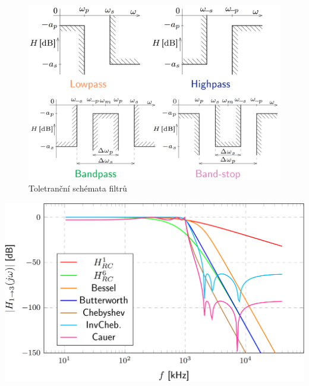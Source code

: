 \documentclass[a4paper,12pt]{article}   %
\begin{document}
\begin{figure}[H]
    \centering
    \includegraphics[width=.6\textwidth]{tolerancni_schema.PNG}
    \caption{Toletranční schémata filtrů}
    \label{fig:tolerancni:schemata}
\end{figure}
\begin{graf}[H]
    \centering
    \includegraphics[width=.8\textwidth]{modul-porovnani.PNG}
    \caption{Porovnání modulových charakteristik všech aproximací}
    \label{graf:modul:porovnani}
\end{graf}
\end{document}

